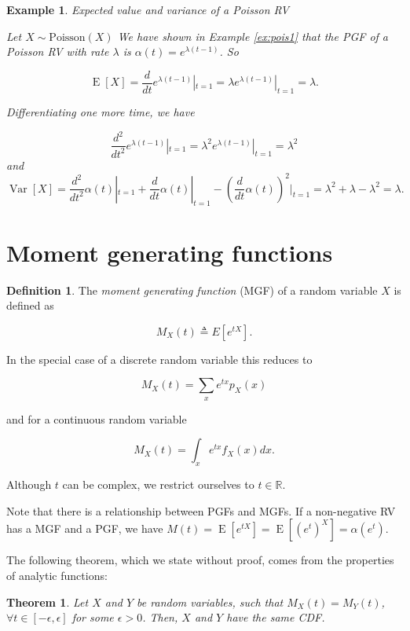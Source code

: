 \documentclass{book}
\theoremstyle{plain}%
\newtheorem{prototheorem}{Example}[section]
\newenvironment{cexample}
   {\colorlet{shadecolor}{gray!10}\begin{shaded}\begin{prototheorem}}
   {\end{prototheorem}\end{shaded}}
\newtheorem{theorem}{Theorem}[section]
\theoremstyle{definition}
\newtheorem{definition}{Definition}[section]
\DeclareMathOperator{\Var}{Var}
\DeclareMathOperator{\E}{E}
\begin{document}
\begin{cexample}{Expected value and variance of a Poisson RV}

Let $X \sim \text{Poisson}(X)$ We have shown in Example \ref{ex:pois1} that the PGF of a Poisson RV with rate $\lambda$ is $\alpha(t) = e^{\lambda(t - 1)}$. So

$$\E[X] = \frac{d}{dt} e^{\lambda(t - 1)} |_{t = 1} = \lambda e^{\lambda(t - 1)} |_{t = 1} = \lambda.$$

Differentiating one more time, we have

$$\frac{d^2}{dt^2} e^{\lambda(t - 1)} |_{t = 1} = \lambda^2 e^{\lambda(t - 1)} |_{t = 1} = \lambda^2$$
and
$$\Var[X] = \frac{d^2}{dt^2}\alpha(t)|_{t=1} + \frac{d}{dt}\alpha(t)|_{t=1} - (\frac{d}{dt}\alpha(t))^2|_{t=1} = \lambda^2 + \lambda - \lambda^2 = \lambda.$$

\end{cexample}

\section{Moment generating functions}

\begin{definition}
The \textit{moment generating function} (MGF) of a random variable $X$ is defined as

$$M_X(t) \triangleq E[e^{tX}].$$

In the special case of a discrete random variable this reduces to

$$M_X(t) = \sum_x e^{tx}p_X(x)$$

and for a continuous random variable

$$M_X(t) = \int_x e^{tx}f_X(x)dx.$$
\end{definition}

Although $t$ can be complex, we restrict ourselves to $t \in \mathbb{R}$.

Note that there is a relationship between PGFs and MGFs. If a non-negative RV has a MGF and a PGF, we have $M(t) = \E[e^{tX}] = \E[(e^t)^X] = \alpha(e^t)$.

The following theorem, which we state without proof, comes from the properties of analytic functions:

\begin{theorem}
Let $X$ and $Y$ be random variables, such that $M_X(t) = M_Y(t)$, $\forall t \in [-\epsilon, \epsilon]$ for some $\epsilon > 0$. Then, $X$ and $Y$ have the same CDF.
\end{theorem}
\end{document}
